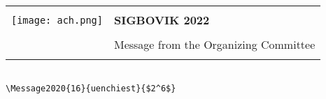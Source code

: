 \documentclass[12pt]{article}
\begin{document}
{\sffamily
\begin{tabular}{ll}
\multirow{3}{*}{\texttt{[image: ach.png]}}\\
& \textbf{\Huge{SIGBOVIK 2022}} \\ &\\
& \LARGE{Message from the Organizing Committee} \\
&\\
\hline
\end{tabular}}
\vspace{2em}
\thispagestyle{empty}

%




\begin{verbatim}

\Message2020{16}{uenchiest}{$2^6$}
\end{verbatim}

%
%
\thispagestyle{empty}
\end{document}

